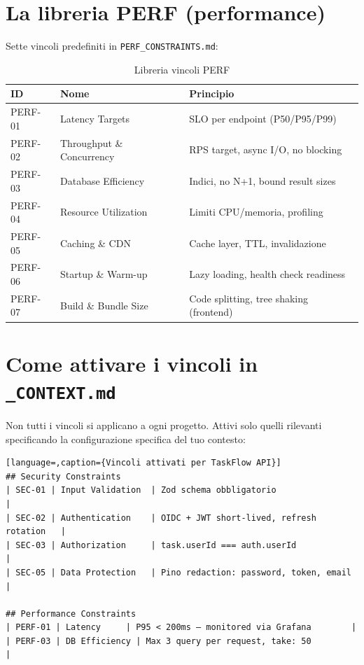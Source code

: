 \section{La libreria PERF (performance)}
\label{sec:11-libreria-perf}

Sette vincoli predefiniti in \texttt{PERF\_CONSTRAINTS.md}:

\begin{table}[htbp]
  \centering
  \begin{tabular}{lll}
    \toprule
    \textbf{ID} & \textbf{Nome} & \textbf{Principio} \\
    \midrule
    PERF-01 & Latency Targets & SLO per endpoint (P50/P95/P99) \\
    PERF-02 & Throughput \& Concurrency & RPS target, async I/O, no blocking \\
    PERF-03 & Database Efficiency & Indici, no N+1, bound result sizes \\
    PERF-04 & Resource Utilization & Limiti CPU/memoria, profiling \\
    PERF-05 & Caching \& CDN & Cache layer, TTL, invalidazione \\
    PERF-06 & Startup \& Warm-up & Lazy loading, health check readiness \\
    PERF-07 & Build \& Bundle Size & Code splitting, tree shaking (frontend) \\
    \bottomrule
  \end{tabular}
  \caption{Libreria vincoli PERF}
  \label{tab:11-perf}
\end{table}

\section{Come attivare i vincoli in \texttt{\_CONTEXT.md}}
\label{sec:11-attivazione}

Non tutti i vincoli si applicano a ogni progetto. Attivi solo quelli rilevanti specificando la configurazione specifica del tuo contesto:

\begin{lstlisting}[language=,caption={Vincoli attivati per TaskFlow API}]
## Security Constraints
| SEC-01 | Input Validation  | Zod schema obbligatorio                    |
| SEC-02 | Authentication    | OIDC + JWT short-lived, refresh rotation   |
| SEC-03 | Authorization     | task.userId === auth.userId                |
| SEC-05 | Data Protection   | Pino redaction: password, token, email     |

## Performance Constraints
| PERF-01 | Latency     | P95 < 200ms — monitored via Grafana        |
| PERF-03 | DB Efficiency | Max 3 query per request, take: 50         |
\end{lstlisting}

